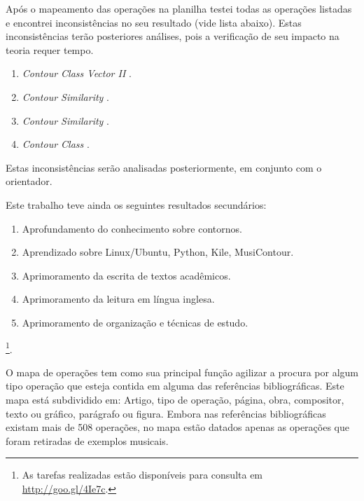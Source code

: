 \documentclass[11pt]{article}
\newcommand{\eng}[1]{\textit{#1}}
\begin{document}
Após o mapeamento das operações na planilha testei todas as operações
listadas e encontrei inconsistências no seu resultado (vide lista abaixo). 
Estas inconsistências terão posteriores análises, pois a verificação de seu 
impacto na teoria requer tempo.

\begin{enumerate}
\item \eng{Contour Class Vector II} \cite[p. 241]{Friedmann1985}.
\item \eng{Contour Similarity} \cite[p. 242]{Quinn1997}.
\item \eng{Contour Similarity} \cite[p. 262]{Quinn1997}.
\item \eng{Contour Class} \cite[p. 113]{Schultz2008}.
\end{enumerate}
Estas inconsistências serão analisadas posteriormente, em conjunto com o
orientador.

Este trabalho teve ainda os seguintes resultados secundários:

\begin{enumerate}
\item Aprofundamento do conhecimento sobre contornos.
\item Aprendizado sobre Linux/Ubuntu, Python, Kile, MusiContour.
\item Aprimoramento da escrita de textos acadêmicos.
\item Aprimoramento da leitura em língua inglesa.
\item Aprimoramento de organização e técnicas de estudo.
\end{enumerate}
\footnote{As tarefas realizadas estão disponíveis para consulta em
  \url{http://goo.gl/4Ie7c}.}.

\label{sec:discussao}

O mapa de operações tem como sua principal função agilizar a procura por
algum tipo operação que esteja contida em alguma das referências bibliográficas.
Este mapa está subdividido em: Artigo, tipo de operação, página, obra, compositor,
texto ou gráfico, parágrafo ou figura. Embora nas referências bibliográficas existam
mais de 508 operações, no mapa estão datados apenas as operações que foram retiradas
de exemplos musicais.
\end{document}
